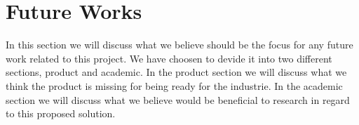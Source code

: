 \chapter{Future Works}
In this section we will discuss what we believe should be the focus for any future work related to this project.
We have choosen to devide it into two different sections, product and academic.
In the product section we will discuss what we think the product is missing for being ready for the industrie.
In the academic section we will discuss what we believe would be beneficial to research in regard to this proposed solution.


